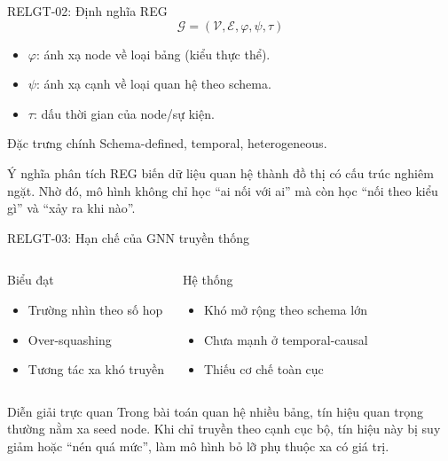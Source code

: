 \documentclass[aspectratio=169,11pt]{beamer}
\begin{document}
\begin{frame}{RELGT-02: Định nghĩa REG}
  \[
    \mathcal{G}=(\mathcal{V},\mathcal{E},\varphi,\psi,\tau)
  \]
  \begin{itemize}
    \item $\varphi$: ánh xạ node về loại bảng (kiểu thực thể).
    \item $\psi$: ánh xạ cạnh về loại quan hệ theo schema.
    \item $\tau$: dấu thời gian của node/sự kiện.
  \end{itemize}
  \begin{exampleblock}{Đặc trưng chính}
    Schema-defined, temporal, heterogeneous.
  \end{exampleblock}
  \begin{block}{Ý nghĩa phân tích}
    REG biến dữ liệu quan hệ thành đồ thị có cấu trúc nghiêm ngặt. Nhờ đó, mô hình không chỉ học “ai nối với ai” mà còn học “nối theo kiểu gì” và “xảy ra khi nào”.
  \end{block}
\end{frame}

\begin{frame}{RELGT-03: Hạn chế của GNN truyền thống}
  \begin{columns}[T]
    \begin{block}{Biểu đạt}
      \begin{itemize}
        \item Trường nhìn theo số hop
        \item Over-squashing
        \item Tương tác xa khó truyền
      \end{itemize}
    \end{block}
    \begin{alertblock}{Hệ thống}
      \begin{itemize}
        \item Khó mở rộng theo schema lớn
        \item Chưa mạnh ở temporal-causal
        \item Thiếu cơ chế toàn cục
      \end{itemize}
    \end{alertblock}
  \end{columns}
  \begin{block}{Diễn giải trực quan}
    Trong bài toán quan hệ nhiều bảng, tín hiệu quan trọng thường nằm xa seed node. Khi chỉ truyền theo cạnh cục bộ, tín hiệu này bị suy giảm hoặc “nén quá mức”, làm mô hình bỏ lỡ phụ thuộc xa có giá trị.
  \end{block}
\end{frame}
\end{document}
